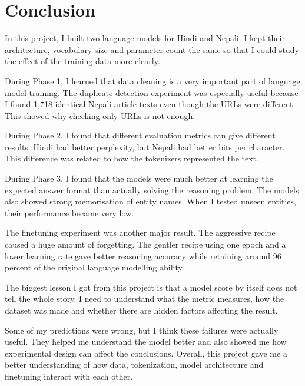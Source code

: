 \documentclass[twocolumn, 10pt]{article}
\begin{document}
\section{Conclusion}
In this project, I built two language models for Hindi and Nepali. I kept their architecture, vocabulary size and parameter count the same so that I could study the effect of the training data more clearly.

During Phase 1, I learned that data cleaning is a very important part of language model training. The duplicate detection experiment was especially useful because I found 1,718 identical Nepali article texts even though the URLs were different. This showed why checking only URLs is not enough.

During Phase 2, I found that different evaluation metrics can give different results. Hindi had better perplexity, but Nepali had better bits per character. This difference was related to how the tokenizers represented the text.

During Phase 3, I found that the models were much better at learning the expected answer format than actually solving the reasoning problem. The models also showed strong memorisation of entity names. When I tested unseen entities, their performance became very low.

The finetuning experiment was another major result. The aggressive recipe caused a huge amount of forgetting. The gentler recipe using one epoch and a lower learning rate gave better reasoning accuracy while retaining around 96 percent of the original language modelling ability.

The biggest lesson I got from this project is that a model score by itself does not tell the whole story. I need to understand what the metric measures, how the dataset was made and whether there are hidden factors affecting the result.

Some of my predictions were wrong, but I think these failures were actually useful. They helped me understand the model better and also showed me how experimental design can affect the conclusions. Overall, this project gave me a better understanding of how data, tokenization, model architecture and finetuning interact with each other.
\end{document}
